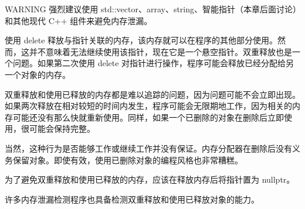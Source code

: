\begin{myWarning}{WARNING}
强烈建议使用 std::vector、array、string、智能指针（本章后面讨论）和其他现代 C++ 组件来避免内存泄漏。
\end{myWarning}


使用 delete 释放与指针关联的内存，该内存就可以在程序的其他部分使用。然而，这并不意味着无法继续使用该指针，现在它是一个悬空指针。双重释放也是一个问题。如果第二次使用 delete 对指针进行操作，程序可能会释放已经分配给另一个对象的内存。

双重释放和使用已释放的内存都是难以追踪的问题，因为问题可能不会立即出现。如果两次释放在相对较短的时间内发生，程序可能会无限期地工作，因为相关的内存可能还没有那么快就重新使用。同样，如果一个已删除的对象在删除后立即使用，很可能会保持完整。

当然，这种行为是否能够工作或继续工作并没有保证。内存分配器在删除后没有义务保留对象。即使有效，使用已删除对象的编程风格也非常糟糕。

为了避免双重释放和使用已释放的内存，应该在释放内存后将指针置为 nullptr。

许多内存泄漏检测程序也具备检测双重释放和使用已释放对象的能力。












